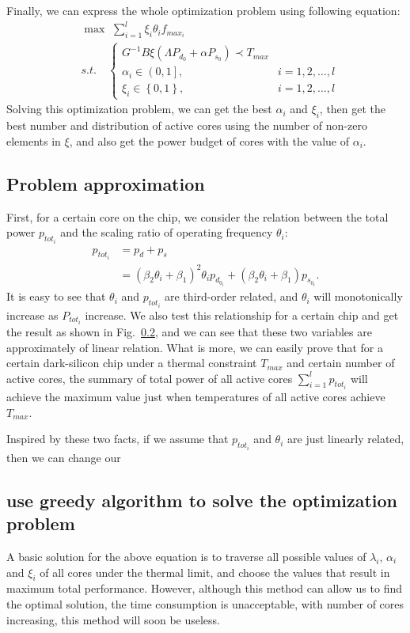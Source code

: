Finally, we can express the whole optimization problem using following equation:
\begin{align*}
&\max\,\, \sum_{i=1}^l \xi_i \theta_i f_{max_i}\\
&s.t.\quad
\begin{cases}
G^{-1} B \xi \left( \Lambda P_{d_0}+ \alpha P_{s_0} \right) \prec T_{max}\\
\alpha_i \in \left(0,1\right], &i=1,2,\ldots,l  \\
\xi_i \in \left\{0,1\right\}, &i=1,2,\ldots,l
\end{cases}
\end{align*}
Solving this optimization problem, we can get the best $\alpha_i$ and $\xi_i$, then get the best number and distribution of active cores using the number of
non-zero elements in $\xi$, and also get the power budget of cores with the value of $\alpha_i$.
\subsection{Problem approximation}
First, for a certain core on the chip, we consider the relation between the total power $p_{tot_{i}}$ and the scaling ratio of operating frequency 
$\theta_i$:
\begin{equation}\label{p_tot and theta} 
\begin{split}
p_{tot_{i}} &=p_d + p_s\\
&= (\beta_{2} \theta_{i} + \beta_{1})^2 \theta_{i} p_{d_{0_i}} + (\beta_2 \theta_i + \beta_1) p_{s_{0_i}}.
\end{split}
\end{equation}  
It is easy to see that $\theta_i$ and $p_{tot_{i}}$ are third-order related, and $\theta_i$ will monotonically increase as 
$P_{tot_{i}}$ increase. We also test this relationship for a certain chip and get the result as shown in Fig.~\ref{}, and we 
can see that these two variables are approximately of linear relation. 
What is more, we can easily prove that for a certain dark-silicon chip under a thermal constraint $T_{max}$ and certain number of active cores, 
the summary of total power of all active cores $\sum_{i=1}^l p_{tot_{i}}$ will achieve the maximum value just when temperatures of all active cores achieve $T_{max}$.  

Inspired by these two facts, if we assume that $p_{tot_{i}}$ and $\theta_i$ are just linearly related, then we can change our   

\subsection{use greedy algorithm to solve the optimization problem}
A basic solution for the above equation is to traverse all possible values of $\lambda_i$, $\alpha_i$ and $\xi_i$ of all cores under the thermal limit,
and choose the values that result in maximum total performance. However, although this method can allow us to find the optimal solution, the time consumption
is unacceptable, with number of cores increasing, this method will soon be useless.

